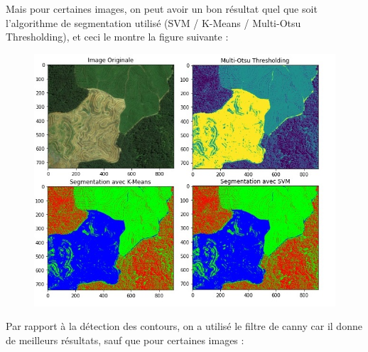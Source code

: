 \documentclass[12pt, openany]{report}
\begin{document}
Mais pour certaines images, on peut avoir un bon résultat quel que soit l'algorithme de segmentation utilisé (SVM / K-Means / Multi-Otsu Thresholding), et ceci le montre la figure suivante :

\begin{figure}[H]
\centering
\includegraphics[scale=1]{montain.jpg}
\end{figure}

Par rapport à la détection des contours, on a utilisé le filtre de canny car il donne de meilleurs résultats, sauf que pour certaines images : 
\end{document}

